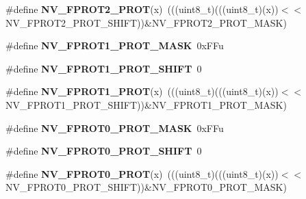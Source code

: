 \begin{DoxyCompactItemize}
\item 
\#define {\bfseries N\+V\+\_\+\+F\+P\+R\+O\+T2\+\_\+\+P\+R\+OT}(x)~(((uint8\+\_\+t)(((uint8\+\_\+t)(x))$<$$<$N\+V\+\_\+\+F\+P\+R\+O\+T2\+\_\+\+P\+R\+O\+T\+\_\+\+S\+H\+I\+FT))\&N\+V\+\_\+\+F\+P\+R\+O\+T2\+\_\+\+P\+R\+O\+T\+\_\+\+M\+A\+SK)\hypertarget{group__NV__Register__Masks_ga3361ca8560d8cdf09a1efcc0b83950fe}{}\label{group__NV__Register__Masks_ga3361ca8560d8cdf09a1efcc0b83950fe}

\item 
\#define {\bfseries N\+V\+\_\+\+F\+P\+R\+O\+T1\+\_\+\+P\+R\+O\+T\+\_\+\+M\+A\+SK}~0x\+F\+Fu\hypertarget{group__NV__Register__Masks_ga4ca39bad3b57769cb423f1616c985e38}{}\label{group__NV__Register__Masks_ga4ca39bad3b57769cb423f1616c985e38}

\item 
\#define {\bfseries N\+V\+\_\+\+F\+P\+R\+O\+T1\+\_\+\+P\+R\+O\+T\+\_\+\+S\+H\+I\+FT}~0\hypertarget{group__NV__Register__Masks_ga06d0cb2797f243b77d60cfecedfc9f86}{}\label{group__NV__Register__Masks_ga06d0cb2797f243b77d60cfecedfc9f86}

\item 
\#define {\bfseries N\+V\+\_\+\+F\+P\+R\+O\+T1\+\_\+\+P\+R\+OT}(x)~(((uint8\+\_\+t)(((uint8\+\_\+t)(x))$<$$<$N\+V\+\_\+\+F\+P\+R\+O\+T1\+\_\+\+P\+R\+O\+T\+\_\+\+S\+H\+I\+FT))\&N\+V\+\_\+\+F\+P\+R\+O\+T1\+\_\+\+P\+R\+O\+T\+\_\+\+M\+A\+SK)\hypertarget{group__NV__Register__Masks_ga04b1531f415057befbd26a0bad3bd7e6}{}\label{group__NV__Register__Masks_ga04b1531f415057befbd26a0bad3bd7e6}

\item 
\#define {\bfseries N\+V\+\_\+\+F\+P\+R\+O\+T0\+\_\+\+P\+R\+O\+T\+\_\+\+M\+A\+SK}~0x\+F\+Fu\hypertarget{group__NV__Register__Masks_gafb9244a297e4e856c53e7cb9515d8549}{}\label{group__NV__Register__Masks_gafb9244a297e4e856c53e7cb9515d8549}

\item 
\#define {\bfseries N\+V\+\_\+\+F\+P\+R\+O\+T0\+\_\+\+P\+R\+O\+T\+\_\+\+S\+H\+I\+FT}~0\hypertarget{group__NV__Register__Masks_gaaae2badd9a03af803a09537c6c89382a}{}\label{group__NV__Register__Masks_gaaae2badd9a03af803a09537c6c89382a}

\item 
\#define {\bfseries N\+V\+\_\+\+F\+P\+R\+O\+T0\+\_\+\+P\+R\+OT}(x)~(((uint8\+\_\+t)(((uint8\+\_\+t)(x))$<$$<$N\+V\+\_\+\+F\+P\+R\+O\+T0\+\_\+\+P\+R\+O\+T\+\_\+\+S\+H\+I\+FT))\&N\+V\+\_\+\+F\+P\+R\+O\+T0\+\_\+\+P\+R\+O\+T\+\_\+\+M\+A\+SK)\hypertarget{group__NV__Register__Masks_ga69a376822e2425a5933dc10569a42d3d}{}\label{group__NV__Register__Masks_ga69a376822e2425a5933dc10569a42d3d}


\end{DoxyCompactItemize}
